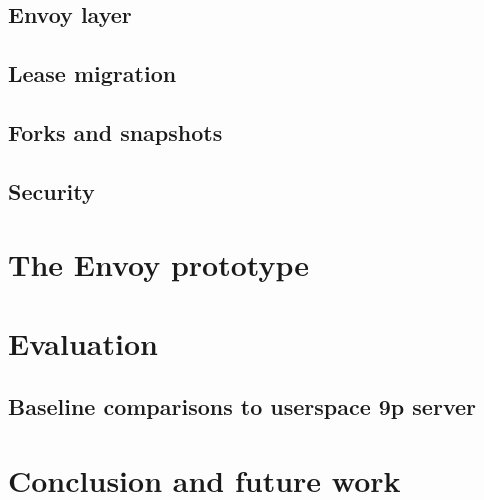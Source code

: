 \documentclass[a4paper]{article}
\begin{document}
\subsection{Envoy layer}
\subsection{Lease migration}
\subsection{Forks and snapshots}
\subsection{Security}

\section{The Envoy prototype}

\subsection{}

\section{Evaluation}

\subsection{Baseline comparisons to userspace 9p server}
\subsection{}

\section{Conclusion and future work}
\end{document}
